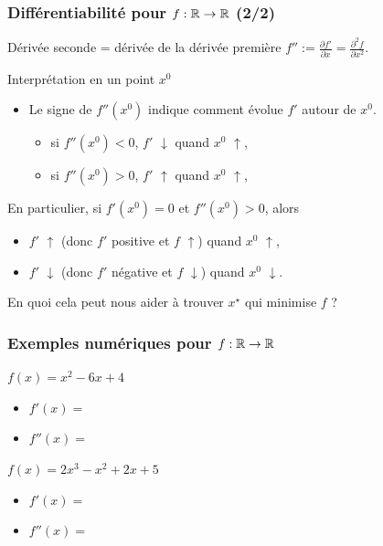 \documentclass{beamer}
\newcommand{\R}{{\ensuremath\mathbb{R}}}
\begin{document}
\begin{frame}
  \frametitle{Différentiabilité pour $f: \R \rightarrow \R$ (2/2) }

  \begin{block}{Dérivée seconde = dérivée de la dérivée première}
    $f'' := \frac{\partial f'}{\partial x} = \frac{\partial ^{2}f}{\partial x^{2}}$.
  \end{block}

  \begin{block}{Interprétation en un point $x^0$}
    \begin{itemize}
    \item Le signe de $f''(x^0)$ indique comment évolue $f'$ autour de $x^0$. 
      \begin{itemize}
      \item si $f''(x^0) < 0$, $f'$ $\downarrow$ quand $x^0$ $\uparrow$,
      \item si $f''(x^0) > 0$, $f'$ $\uparrow$ quand $x^0$ $\uparrow$,
      \end{itemize}
    \end{itemize}
  \end{block}

  \begin{block}{En particulier, si $f'(x^0) = 0$ et $f''(x^0) > 0$, alors}
    \begin{itemize}
      \item $f'$ $\uparrow$ (donc $f'$ positive et $f$ $\uparrow$) quand $x^0$ $\uparrow$,
      \item $f'$ $\downarrow$ (donc $f'$ négative et $f$ $\downarrow$) quand $x^0$ $\downarrow$. 
    \end{itemize}
    \alert<2->{En quoi cela peut nous aider à trouver $x^\star$ qui minimise $f$ ?}
  \end{block}
  
\end{frame}

\begin{frame}
  \frametitle{Exemples numériques pour $f:\R \rightarrow \R$}

  \begin{block}{$f(x) = x^2 - 6x + 4$}
    \begin{itemize}
      \item $f'(x) =$\only<1>{?}
      \item $f''(x) =$ 
    \end{itemize}
  \end{block}

  \begin{block}{$f(x) = 2x^3 - x^2 + 2x + 5$}
    \begin{itemize}
      \item $f'(x) =$\only<1>{?}
      \item $f''(x) = $
    \end{itemize}
  \end{block}
  
\end{frame}
\end{document}

